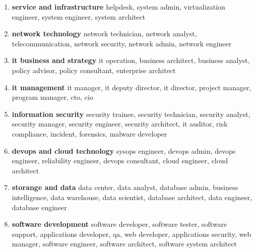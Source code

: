 \begin{enumerate}
  \item \textbf{service and infrastructure}
  \newline
  helpdesk,
  system admin, 
  virtualization engineer, 
  system engineer, 
  system architect
    
  \item \textbf{network technology}
  \newline
  network technician, 
  network analyst, 
  telecommunication, 
  network security, 
  network admin, 
  network engineer

  \item \textbf{it business and strategy}
  \newline
  it operation, 
  business architect, 
  business analyst, 
  policy advisor, 
  policy consultant, 
  enterprise architect

  \item \textbf{it management}
  \newline
  it manager, 
  it deputy director, 
  it director, 
  project manager, 
  program manager, 
  cto, 
  cio

  \item \textbf{information security}
  \newline
  security trainee, 
  security technician, 
  security analyst, 
  security manager, 
  security engineer, 
  security architect, 
  it auditor, 
  risk compliance, 
  incident, 
  forensics, 
  malware developer

  \item \textbf{devops and cloud technology}
  \newline
  sysops engineer, 
  devops admin, 
  devops engineer, 
  reliability engineer, 
  devops consultant, 
  cloud engineer, 
  cloud architect

  \item \textbf{storange and data}
  \newline
  data center, 
  data analyst, 
  database admin, 
  business intelligence, 
  data warehouse, 
  data scientist, 
  database architect, 
  data engineer, 
  database engineer

  \item \textbf{software development}
  \newline
  software developer, 
  software tester, 
  software support, 
  applications developer, 
  qa, 
  web developer, 
  applications security, 
  web manager, 
  software engineer, 
  software architect, 
  software system architect
\end{enumerate}

